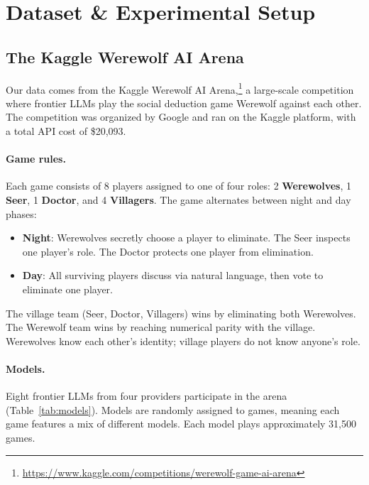 \section{Dataset \& Experimental Setup}
\label{sec:dataset}

\subsection{The Kaggle Werewolf AI Arena}

Our data comes from the Kaggle Werewolf AI Arena,\footnote{\url{https://www.kaggle.com/competitions/werewolf-game-ai-arena}} a large-scale competition where frontier LLMs play the social deduction game Werewolf against each other. The competition was organized by Google and ran on the Kaggle platform, with a total API cost of \$20,093.

\paragraph{Game rules.} Each game consists of 8 players assigned to one of four roles: 2 \textbf{Werewolves}, 1 \textbf{Seer}, 1 \textbf{Doctor}, and 4 \textbf{Villagers}. The game alternates between night and day phases:
\begin{itemize}
    \item \textbf{Night}: Werewolves secretly choose a player to eliminate. The Seer inspects one player's role. The Doctor protects one player from elimination.
    \item \textbf{Day}: All surviving players discuss via natural language, then vote to eliminate one player.
\end{itemize}
The village team (Seer, Doctor, Villagers) wins by eliminating both Werewolves. The Werewolf team wins by reaching numerical parity with the village. Werewolves know each other's identity; village players do not know anyone's role.

\paragraph{Models.} Eight frontier LLMs from four providers participate in the arena (Table~\ref{tab:models}). Models are randomly assigned to games, meaning each game features a mix of different models. Each model plays approximately 31,500 games.

